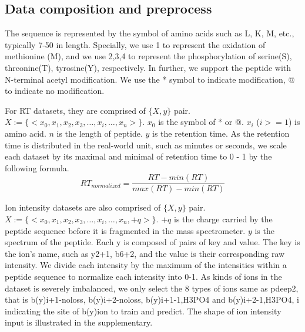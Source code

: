 
\subsection{Data composition and preprocess}
The sequence is represented by the symbol of amino acids such as L, K, M, etc., typically 7-50 in length. Specially, we use 1 to represent the oxidation of methionine (M), and we use 2,3,4 to represent the phosphorylation of serine(S), threonine(T), tyrosine(Y), respectively. In further, we support the peptide with N-terminal acetyl modification. We use the * symbol to indicate modification, @ to indicate no modification. 

For RT datasets, they are comprised of \( \{X, y\} \) pair. 
$X:= \{ <x_0, x_1, x_2, x_3,\dots, x_i, \dots, x_n>\}$. $x_0$ is the symbol of * or @. 
$x_i$ ($i>= 1$) is amino acid. $n$ is the length of peptide. \( y \) is the retention time. 
As the retention time is distributed in the real-world unit, such as minutes or seconds, we scale each dataset by its maximal and minimal of retention time to 0 - 1 by the following formula. 
\[RT_{normalized} = \frac{RT-min(RT)}{max(RT)-min(RT)}\]



Ion intensity datasets are also comprised of \( \{X, y\} \) pair. 
$X := \{ <x_0, x_1, x_2, x_3,\dots, x_i, \dots, x_n, +q> \}$. $+q$
is the charge carried by the peptide sequence before it is fragmented in the mass spectrometer. \( y \) is the spectrum of the peptide. Each y is composed of pairs of key and value.
The key is the ion's name, such as y2+1, b6+2, and the value is their corresponding raw intensity.
We divide each intensity by the maximum of the intensities within a peptide sequence to normalize each intensity into 0-1. As kinds of ions in the dataset is severely imbalanced, we only select the 8 types of ions same as pdeep2, that is b(y)i+1-noloss, b(y)i+2-noloss, b(y)i+1-1,H3PO4 and b(y)i+2-1,H3PO4, i indicating the site of b(y)ion to train and predict. The shape of ion intensity input is illustrated in the supplementary.



 
% 